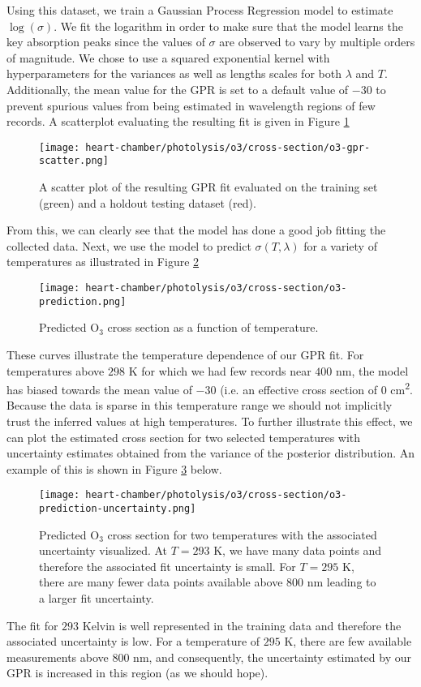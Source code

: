 Using this dataset, we train a Gaussian Process Regression model to estimate $\log(\sigma)$. We fit the logarithm in order to make sure that the model learns the key absorption peaks since the values of $\sigma$ are observed to vary by multiple orders of magnitude. We chose to use a squared exponential kernel with hyperparameters for the variances as well as lengths scales for both $\lambda$ and $T$. Additionally, the mean value for the GPR is set to a default value of $-30$ to prevent spurious values from being estimated in wavelength regions of few records. A scatterplot evaluating the resulting fit is given in Figure \ref{fig:cs-o3-scatter}
\begin{figure}[!hbt]
  \centering
  \texttt{[image: heart-chamber/photolysis/o3/cross-section/o3-gpr-scatter.png]}
  \caption{A scatter plot of the resulting GPR fit evaluated on the training set (green) and a holdout testing dataset (red).}
  \label{fig:cs-o3-scatter}
\end{figure}
From this, we can clearly see that the model has done a good job fitting the collected data. Next, we use the model to predict $\sigma(T,\lambda)$ for a variety of temperatures as illustrated in Figure \ref{fig:cs-o3-pred}
\begin{figure}[h]
  \centering
  \texttt{[image: heart-chamber/photolysis/o3/cross-section/o3-prediction.png]}
  \caption{Predicted $\mathrm{O_3}$ cross section as a function of temperature.}
  \label{fig:cs-o3-pred}
\end{figure}
These curves illustrate the temperature dependence of our GPR fit. For temperatures above $298$ K for which we had few records near $400$ nm, the model has biased towards the mean value of $-30$ (i.e. an effective cross section of $0$ cm\textsuperscript{2}. Because the data is sparse in this temperature range we should not implicitly trust the inferred values at high temperatures. To further illustrate this effect, we can plot the estimated cross section for two selected temperatures with uncertainty estimates obtained from the variance of the posterior distribution. An example of this is shown in Figure \ref{fig:cs-o3-fit-unc} below.
\begin{figure}[!hbt]
  \centering
  \texttt{[image: heart-chamber/photolysis/o3/cross-section/o3-prediction-uncertainty.png]}
  \caption{Predicted $\mathrm{O_3}$ cross section for two temperatures with the associated uncertainty visualized. At $T=293$ K, we have many data points and therefore the associated fit uncertainty is small. For $T=295$ K, there are many fewer data points available above $800$ nm leading to a larger fit uncertainty.}
  \label{fig:cs-o3-fit-unc}
\end{figure}
The fit for $293$ Kelvin is well represented in the training data and therefore the associated uncertainty is low. For a temperature of $295$ K, there are few available measurements above $800$ nm, and consequently, the uncertainty estimated by our GPR is increased in this region (as we should hope).

